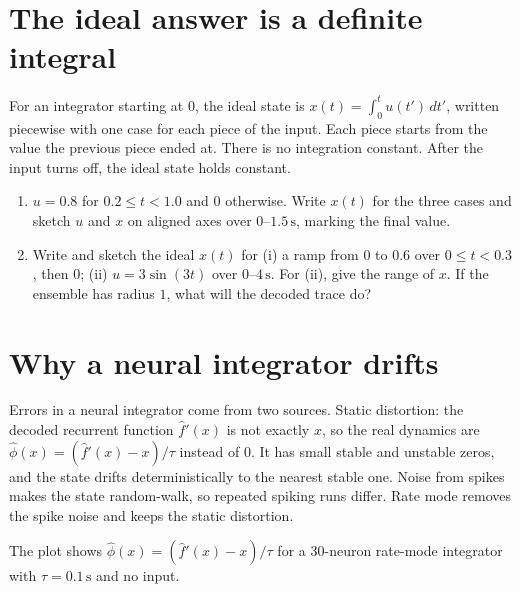 \documentclass[11pt,letterpaper]{article}
\begin{document}
\section{The ideal answer is a definite integral}

\begin{idea}
For an integrator starting at $0$, the ideal state is $x(t) = \int_0^t u(t')\,dt'$, written piecewise with one case for each piece of the input. Each piece starts from the value the previous piece ended at. There is no integration constant. After the input turns off, the ideal state holds constant.
\end{idea}

\begin{enumerate}
\item $u = 0.8$ for $0.2 \le t < 1.0$ and $0$ otherwise. Write $x(t)$ for the three cases and sketch $u$ and $x$ on aligned axes over $0$--$1.5\,\mathrm{s}$, marking the final value.
\item Write and sketch the ideal $x(t)$ for (i) a ramp from $0$ to $0.6$ over $0 \le t < 0.3$, then $0$; (ii) $u = 3\sin(3t)$ over $0$--$4\,\mathrm{s}$. For (ii), give the range of $x$. If the ensemble has radius $1$, what will the decoded trace do?
\end{enumerate}

\section{Why a neural integrator drifts}

\begin{idea}
Errors in a neural integrator come from two sources. Static distortion: the decoded recurrent function $\hat f'(x)$ is not exactly $x$, so the real dynamics are $\hat\phi(x) = (\hat f'(x) - x)/\tau$ instead of $0$. It has small stable and unstable zeros, and the state drifts deterministically to the nearest stable one. Noise from spikes makes the state random-walk, so repeated spiking runs differ. Rate mode removes the spike noise and keeps the static distortion.
\end{idea}

The plot shows $\hat\phi(x) = (\hat f'(x) - x)/\tau$ for a $30$-neuron rate-mode integrator with $\tau = 0.1\,\mathrm{s}$ and no input.

\begin{center}
\end{center}
\end{document}
